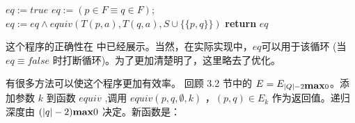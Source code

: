 \begin{algorithm}
    \small
    \begin{algorithmic}[1]
                $eq := true$
                \State $ eq := ( p \in F \equiv q \in F ) $;
                    \State $eq:= eq \land equiv ( T(p,a),T(q,a),S\cup \{ \{ p,q\} \}  ) $
                \EndFor
            \EndIf
            \State \textbf{return} $eq$
        \EndFunction
    \end{algorithmic}
\end{algorithm}
这个程序的正确性在 \cite{t-Ei91} 中已经展示。当然，在实际实现中，$eq$可以用于该循环 (当 $eq \equiv false$ 时打断循环)。为了更加清楚明了，这里略去了优化。

有很多方法可以使这个程序更加有效率。 回顾 3.2 节中的 $ E = E_{ |Q|-2 \mbox{\textbf{max}} 0 } $。添加参数 $k$ 到函数 $equiv$ ,调用 $equiv(p,q,\emptyset,k)$ ，$ (p,q) \in E_k $ 作为返回值。递归深度由 $ (|q|-2) \mbox{\textbf{max}} 0 $ 决定。新函数是：

